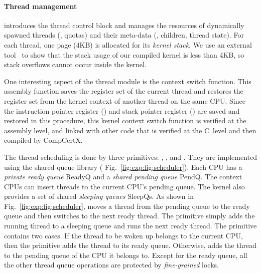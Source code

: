 \vspace*{-10pt}
\paragraph{Thread management}
introduces the thread control block and manages the resources of
dynamically spawned threads (\eg, quotas) and their meta-data (\eg,
children, thread state).  For each thread, one page (4KB) is
allocated for its \emph{kernel stack}.  We use an external
tool~\cite{veristack} to show that the stack usage of our compiled
kernel is  less than 4KB, so stack overflows cannot occur inside
the kernel.

One interesting aspect of the thread module is the context switch
function.  This assembly function saves the register set of the
current thread and restores the register set from the kernel context
of another thread on the same CPU.  Since the instruction pointer
register () and stack pointer register () are
saved and restored in this procedure, this kernel context switch
function is verified at the assembly level, and linked with other code
that is verified at the C~level and then compiled by CompCertX.

The thread scheduling is done by three primitives: ,
, and . They are implemented using the shared queue library (\cf
Fig.~\ref{fig:exp:fig:scheduler}).  Each CPU has a \emph{private ready
  queue} ReadyQ and a \emph{shared pending queue} PendQ.
The context CPUs can insert threads to the current CPU's pending
queue.  The {\mCTOS} kernel also provides a set of  shared \emph{sleeping
  queues} SleepQs.  As shown
in Fig.~\ref{fig:exp:fig:scheduler},    moves
a thread from the pending queue to the ready queue and then switches to
the next ready thread.  The  primitive simply adds the
running thread to a sleeping queue and runs the next ready thread.
The  primitive contains two cases.  If the thread to be
woken up belongs to the current CPU, then the primitive adds the
thread to its ready queue.  Otherwise,  adds the thread
to the pending queue of the CPU it belongs to.  Except for the ready
queue, all the other thread queue operations are protected by
\emph{fine-grained} locks.

